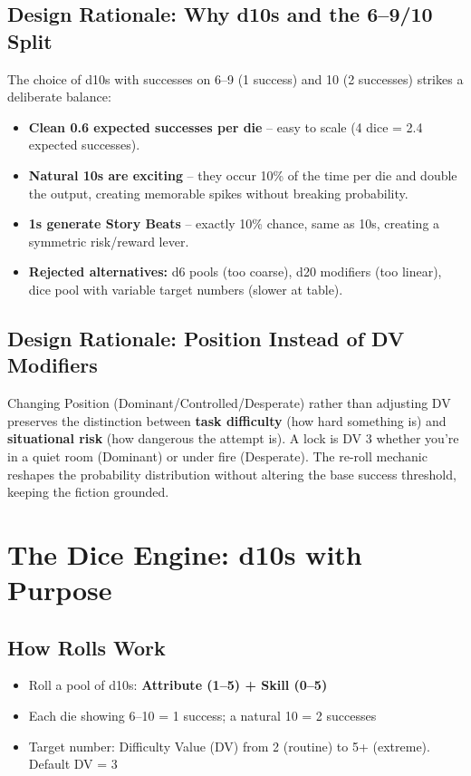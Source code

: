\documentclass[11pt]{article}
\begin{document}
\subsection{Design Rationale: Why d10s and the 6--9/10 Split}
\label{sec:why-d10}
The choice of d10s with successes on 6--9 (1 success) and 10 (2 successes) strikes a deliberate balance:
\begin{itemize}
    \item \textbf{Clean 0.6 expected successes per die} -- easy to scale (4 dice = 2.4 expected successes).
    \item \textbf{Natural 10s are exciting} -- they occur 10\% of the time per die and double the output, creating memorable spikes without breaking probability.
    \item \textbf{1s generate Story Beats} -- exactly 10\% chance, same as 10s, creating a symmetric risk/reward lever.
    \item \textbf{Rejected alternatives:} d6 pools (too coarse), d20 modifiers (too linear), dice pool with variable target numbers (slower at table).
\end{itemize}

\subsection{Design Rationale: Position Instead of DV Modifiers}
\label{sec:why-position}
Changing Position (Dominant/Controlled/Desperate) rather than adjusting DV preserves the distinction between \textbf{task difficulty} (how hard something is) and \textbf{situational risk} (how dangerous the attempt is). A lock is DV 3 whether you're in a quiet room (Dominant) or under fire (Desperate). The re-roll mechanic reshapes the probability distribution without altering the base success threshold, keeping the fiction grounded.

\section{The Dice Engine: d10s with Purpose}

\subsection{How Rolls Work}
\begin{itemize}
    \item Roll a pool of d10s: \textbf{Attribute (1--5) + Skill (0--5)}
    \item Each die showing 6--10 = 1 success; a natural 10 = 2 successes
    \item Target number: Difficulty Value (DV) from 2 (routine) to 5+ (extreme). Default DV = 3
\end{itemize}
\end{document}
